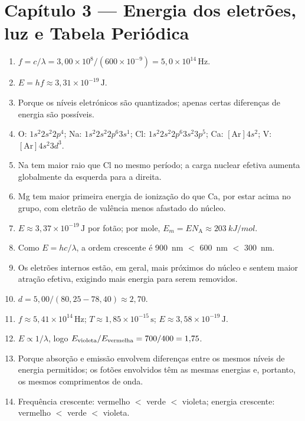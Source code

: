 \documentclass[11pt,a4paper,oneside]{book}
\newcommand{\NA}{N_{\mathrm A}}
\begin{document}
\section*{Capítulo 3 — Energia dos eletrões, luz e Tabela Periódica}
\begin{enumerate}
  \item $f=c/\lambda=3{,}00\times10^8/(600\times10^{-9})=5{,}0\times10^{14}\,\mathrm{Hz}$.
  \item $E=hf\approx3{,}31\times10^{-19}\,\mathrm{J}$.
  \item Porque os níveis eletrónicos são quantizados; apenas certas diferenças de energia são possíveis.
  \item O: $1s^2 2s^2 2p^4$; Na: $1s^2 2s^2 2p^6 3s^1$; Cl: $1s^2 2s^2 2p^6 3s^2 3p^5$; Ca: $[\mathrm{Ar}]4s^2$; V: $[\mathrm{Ar}]4s^2 3d^3$.
  \item Na tem maior raio que Cl no mesmo período; a carga nuclear efetiva aumenta globalmente da esquerda para a direita.
  \item Mg tem maior primeira energia de ionização do que Ca, por estar acima no grupo, com eletrão de valência menos afastado do núcleo.
  \item $E\approx3{,}37\times10^{-19}\,\mathrm{J}$ por fotão; por mole, $E_m=E\NA\approx\SI{203}{kJ/mol}$.
  \item Como $E=hc/\lambda$, a ordem crescente é \SI{900}{nm} $<$ \SI{600}{nm} $<$ \SI{300}{nm}.
  \item Os eletrões internos estão, em geral, mais próximos do núcleo e sentem maior atração efetiva, exigindo mais energia para serem removidos.
  \item $d=5{,}00/(80{,}25-78{,}40)\approx2{,}70$.
  \item $f\approx5{,}41\times10^{14}\,\mathrm{Hz}$; $T\approx1{,}85\times10^{-15}\,\mathrm{s}$; $E\approx3{,}58\times10^{-19}\,\mathrm{J}$.
  \item $E\propto1/\lambda$, logo $E_{\rm violeta}/E_{\rm vermelha}=700/400=1{,}75$.
  \item Porque absorção e emissão envolvem diferenças entre os mesmos níveis de energia permitidos; os fotões envolvidos têm as mesmas energias e, portanto, os mesmos comprimentos de onda.
  \item Frequência crescente: vermelho $<$ verde $<$ violeta; energia crescente: vermelho $<$ verde $<$ violeta.


\end{enumerate}
\end{document}
